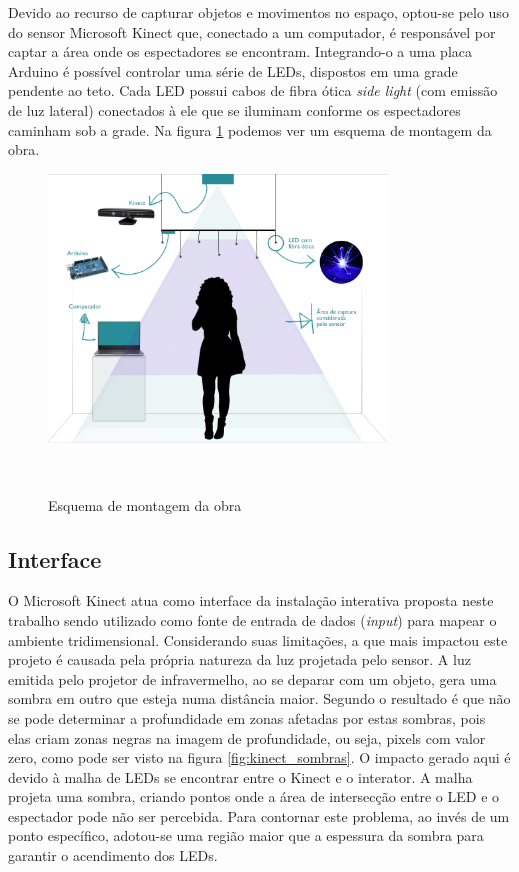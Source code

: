 Devido ao recurso de capturar objetos e movimentos no espaço, optou-se pelo uso do sensor Microsoft Kinect que, conectado a um computador, é responsável por captar a área onde os espectadores se encontram. Integrando-o a uma placa Arduino é possível controlar uma série de LEDs, dispostos em uma grade pendente ao teto. Cada LED possui cabos de fibra ótica \textit{side light} (com emissão de luz lateral) conectados à ele que se iluminam conforme os espectadores caminham sob a grade. Na figura \ref{fig:esquema} podemos ver um esquema de montagem da obra.

\begin{figure}[H]
  \begin{center}
    \caption{Esquema de montagem da obra}
    \vspace*{0,2cm}
    \includegraphics[width=0.8\textwidth]{./04-figuras/esquema}
    \label{fig:esquema}
  \end{center}
  \vspace*{-0,9cm}
  \\
\end{figure}


\subsection{Interface}

O Microsoft Kinect atua como interface da instalação interativa proposta neste trabalho sendo utilizado como fonte de entrada de dados (\textit{input}) para mapear o ambiente tridimensional. Considerando suas limitações, a que mais impactou este projeto é causada pela própria natureza da luz projetada pelo sensor. A luz emitida pelo projetor de infravermelho, ao se deparar com um objeto, gera uma sombra em outro que esteja numa distância maior. Segundo  o resultado é que não se pode determinar a profundidade em zonas afetadas por estas sombras, pois elas criam zonas negras na imagem de profundidade, ou seja, pixels com valor zero, como pode ser visto na figura \ref{fig:kinect_sombras}. O impacto gerado aqui é devido à malha de LEDs se encontrar entre o Kinect e o interator. A malha projeta uma sombra, criando pontos onde a área de intersecção entre o LED e o espectador pode não ser percebida. Para contornar este problema, ao invés de um ponto específico, adotou-se uma região maior que a espessura da sombra para garantir o acendimento dos LEDs.

